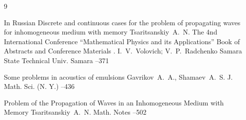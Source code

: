 \newpage

\EngRef

\begin{thebibliography}{9}

\lang In Russian
\paper Discrete and continuous cases for the problem of propagating waves for inhomogeneous medium with memory
\by Tsaritsanskiy~A.~N.
\inbook The 4nd International Conference ``Mathematical Physics and its Applications''
\bookinfo Book of Abstracts and Conference Materials
\eds. I.~V.~Volovich; V.~P.~Radchenko
\publ Samara State Technical Univ.
\publaddr Samara
--371

\paper Some problems in acoustics of emulsions
\by    Gavrikov~A.~A., Shamaev~A.~S.
\jour J. Math. Sci. (N. Y.)
--436


\paper Problem of the Propagation of Waves in an Inhomogeneous Medium with Memory 
\by Tsaritsanskiy~A.~N.
\jour Math. Notes
--502


\end{thebibliography}

\EngDate


\newpage
\Russian

%

